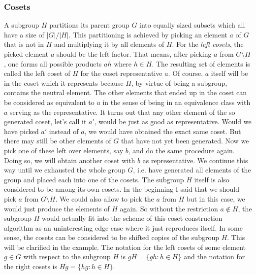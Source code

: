 


\subsubsection{Cosets}
A subgroup $H$ partitions its parent group $G$ into equally sized subsets which all have a size of $|G| / |H|$. This partitioning is achieved by picking an element $a$ of $G$ that is not in $H$ and multiplying it by all elements of $H$. For the \emph{left cosets}, the picked element $a$ should be the left factor. That means, after picking $a$ from $G \setminus H$, one forms all possible products $a h$ where $h \in H$. The resulting set of elements is called the left coset of $H$ for the coset representative $a$. Of course, $a$ itself will be in the coset which it represents because $H$, by virtue of being a subgroup, contains the neutral element. The other elements that ended up in the coset can be considered as equivalent to $a$ in the sense of being in an equivalence class with $a$ serving as the representative. It turns out that any other element of the so generated coset, let's call it $a'$, would be just as good as representative. Would we have picked $a'$ instead of $a$, we would have obtained the exact same coset. But there may still be other elements of $G$ that have not yet been generated. Now we pick one of these left over elements, say $b$, and do the same procedure again. Doing so, we will obtain another coset with $b$ as representative. We continue this way until we exhausted the whole group $G$, i.e. have generated all elements of the group and placed each into one of the cosets. The subgroup $H$ itself is also considered to be among its own cosets. In the beginning I said that we should pick $a$ from $G \setminus H$. We could also allow to pick the $a$ from $H$ but in this case, we would just produce the elements of $H$ again. So without the restriction $a \notin H$, the subgroup $H$ would actually fit into the scheme of this coset construction algorithm as an uninteresting edge case where it just reproduces itself. In some sense, the cosets can be considered to be shifted copies of the subgroup $H$. This will be clarified in the example. The notation for the left cosets of some element $g \in G$ with respect to the subgroup $H$ is $g H = \{ g h : h \in H \}$ and the notation for the right cosets is $H g = \{ h g : h \in H \}$.

